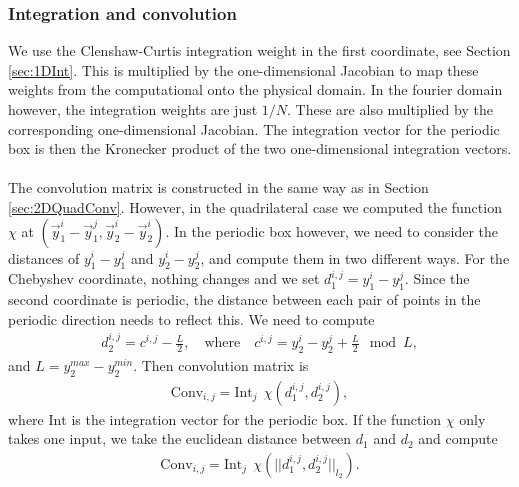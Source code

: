 \subsubsection{Integration and convolution}
We use the Clenshaw-Curtis integration weight in the first coordinate, see Section \ref{sec:1DInt}. This is multiplied by the one-dimensional Jacobian to map these weights from the computational onto the physical domain. In the fourier domain however, the integration weights are just $1/N$. These are also multiplied by the corresponding one-dimensional Jacobian. The integration vector for the periodic box is then the Kronecker product of the two one-dimensional integration vectors.
\\
\\
The convolution matrix is constructed in the same way as in Section \ref{sec:2DQuadConv}. However, in the quadrilateral case we computed the function $\chi$ at $\left(\vec {y}_1^{i} - \vec {y}_1^{j}, \vec{y}_2^{i} - \vec {y}_2^{i} \right)$. In the periodic box however, we need to consider the distances of ${y}_1^{i} - {y}_1^{j}$ and ${y}_2^{i} - {y}_2^{j}$, and compute them in two different ways. For the Chebyshev coordinate, nothing changes and we set $d_1^{i,j} = {y}_1^{i} - {y}_1^{j}$. Since the second coordinate is periodic, the distance between each pair of points in the periodic direction needs to reflect this. We need to compute 
\begin{align*}	
	d_2^{i,j} = c^{i,j} - \frac{L}{2}, \quad \text{where} \quad c^{i,j} =  {y}_2^{i} - {y}_2^{j} + \frac{L}{2} \mod L,
\end{align*}
and $L = y_2^{max} - y_2^{min}$. 
Then convolution matrix is
\begin{align*}
	\text{Conv}_{i,j} = \text{Int}_j \ \ \chi(d_1^{i,j}, d_2^{i,j}),
\end{align*}
where $\text{Int}$ is the integration vector for the periodic box.
If the function $\chi$ only takes one input, we take the euclidean distance between $d_1$ and $d_2$ and compute
\begin{align*}
	\text{Conv}_{i,j} = \text{Int}_j \ \ \chi(||d_1^{i,j}, d_2^{i,j}||_{l_2}).
\end{align*}
